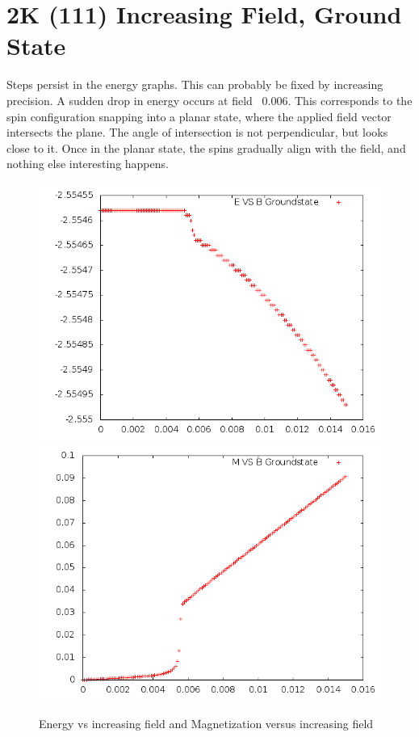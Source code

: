 \documentclass{article}
\begin{document}
\section{2K (111) Increasing Field, Ground State}
Steps persist in the energy graphs. This can probably be fixed by increasing precision. 
A sudden drop in energy occurs at field ~0.006. This corresponds to the spin configuration snapping
into a planar state, where the applied field vector intersects the plane. The angle of intersection
is not perpendicular, but looks close to it. Once in the planar state, the spins gradually align
with the field, and nothing else interesting happens. 
\begin{figure}[h]
 \centering 
\includegraphics[scale=0.3]{111_2000/E000to005G.png}
\includegraphics[scale=0.3]{111_2000/M000to005G.png}
\caption{Energy vs increasing field and Magnetization versus increasing field}
\end{figure}
\end{document}
